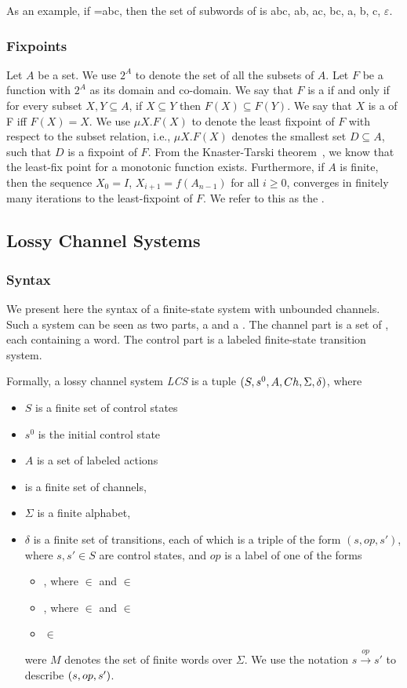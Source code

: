 As an example, if =abc, then the set of subwords of  is {abc, ab, ac, bc, a, b, c, $\varepsilon$}.

\subsubsection{Fixpoints}
Let $A$ be a set. We use $2^A$ to denote the set of all the subsets of $A$. Let $F$ be a function with $2^A$ as its domain and co-domain. We say that $F$ is a  if and only if for every subset $X,Y \subseteq A$, if $X \subseteq Y$ then $F(X) \subseteq F(Y)$.  We say that $X$ is a  of F iff $F(X)=X$. We use $\mu X. F(X)$ to denote the least fixpoint of $F$ with respect to the subset relation, i.e.,  $\mu X. F(X)$ denotes the smallest set $D \subseteq A$, such that $D$ is a fixpoint of $F$. From the Knaster-Tarski theorem~\cite{tarski}, we know that the least-fix point for a monotonic function exists. Furthermore, if $A$ is finite, then the sequence $X_0 = I$, $X_{i+1} = f(A_{n-1})$ for all $i \geq 0$, converges in finitely many iterations to the least-fixpoint of $F$. We refer to this as the .

\subsection{Lossy Channel Systems}
\label{CS}
\subsubsection{Syntax}
We present here the syntax of a finite-state system with unbounded channels. Such a system can be seen as two parts, a  and a . The channel part is a set of , each containing a word. The control part is a labeled finite-state transition system.

Formally, a lossy channel system \emph{LCS} is a tuple $(S,s^0, A, Ch,\Sigma, \delta)$, where
\begin{itemize}
  \item $S$ is a finite set of control states
  \item $s^0$ is the initial control state
  \item $A$ is a set of labeled actions
  \item {} is a finite set of channels,
  \item $\Sigma$ is a finite alphabet,
  \item $\delta$ is a finite set of transitions, each of which is a triple of the form $( s,op,s')$, where $s, s'\in S$ are control states, and $op$ is a label of one of the forms
    \begin{itemize}
      \item {}, where  $\in$  and  $\in$ 
      \item {}, where  $\in$  and  $\in$ 
      \item {} $\in$ 
    \end{itemize}
    were $M$ denotes the set of finite words over $\Sigma$. We use the notation $s \xrightarrow{op} s'$ to describe $(s, op, s')$.
\end{itemize}

